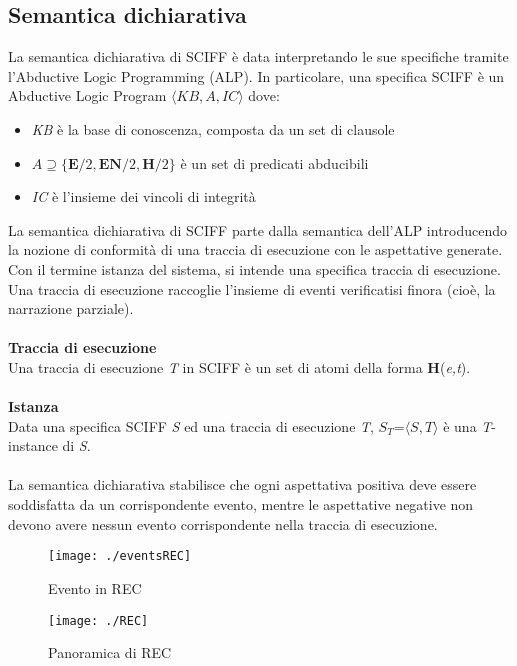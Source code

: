 \documentclass[a4paper,12pt]{report}
\begin{document}
\subsection{Semantica dichiarativa}
La semantica dichiarativa di SCIFF è data interpretando le sue specifiche tramite l'Abductive Logic Programming (ALP). In particolare, una specifica SCIFF è un Abductive Logic Program \textit{$\langle KB,A,IC \rangle$} dove:
\begin{itemize}
 \item \textit{KB} è la base di conoscenza, composta da un set di clausole
 \item $A \supseteq\{\textbf{E}/2,\textbf{EN}/2,\textbf{H}/2\}$ è un set di predicati abducibili
 \item \textit{IC} è l'insieme dei vincoli di integrità
\end{itemize}
La semantica dichiarativa di SCIFF parte dalla semantica dell'ALP introducendo la nozione di conformità di una traccia di esecuzione con le aspettative generate. Con il termine istanza del sistema, si intende una specifica traccia di esecuzione. Una traccia di esecuzione raccoglie l'insieme di eventi verificatisi finora (cioè, la narrazione parziale).\\
\\\textbf{Traccia di esecuzione}\\
Una traccia di esecuzione \textsl{T} in SCIFF è un set di atomi della forma \textbf{H}(\textit{e,t}).\\
\\\textbf{Istanza}\\
Data una specifica SCIFF \textsl{S} ed una traccia di esecuzione \textsl{T}, \textsl{$S_T$}=$\langle S,T\rangle$ è una \textsl{T}-instance di \textsl{S}.\\
\\La semantica dichiarativa stabilisce che ogni aspettativa positiva deve essere soddisfatta da un corrispondente evento, mentre le aspettative negative non devono avere nessun evento corrispondente nella traccia di esecuzione.
\newpage
\begin{figure}[h]
    \bigskip
    \begin{center}
        \texttt{[image: ./eventsREC]}
        \caption{Evento in REC}
        \label{event}
    \end{center}
\bigskip
\bigskip
    \begin{center}
        \texttt{[image: ./REC]}
        \caption{Panoramica di REC}
        \label{REC}
    \end{center}
\end{figure}
\newpage
\end{document}
